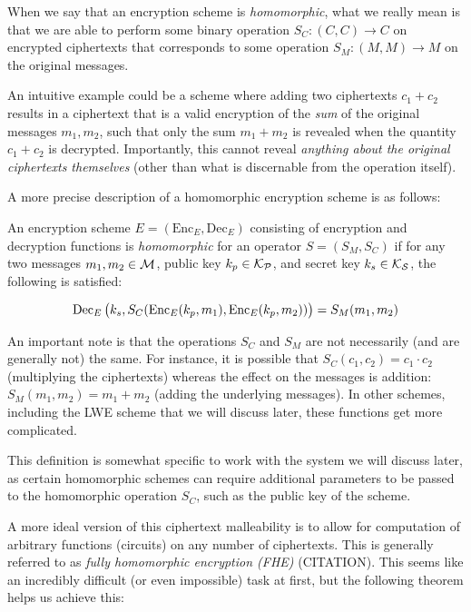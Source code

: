 \documentclass{theme}
\newcommand{\Enc}{\text{Enc}}
\newcommand{\Dec}{\text{Dec}}
\begin{document}
When we say that an encryption scheme is \textit{homomorphic}, what we really mean is that we are able to perform some binary operation $S_C: (C,C) \to C$ on encrypted ciphertexts that corresponds to some operation $S_M: (M, M) \to M$ on the original messages.

An intuitive example could be a scheme where adding two ciphertexts $c_1 + c_2$ results in a ciphertext that is a valid encryption of the \textit{sum} of the original messages $m_1,m_2$, such that only the sum $m_1 + m_2$ is revealed when the quantity $c_1 + c_2$ is decrypted. Importantly, this cannot reveal \textit{anything about the original ciphertexts themselves} (other than what is discernable from the operation itself).

A more precise description of a homomorphic encryption scheme is as follows:

\begin{ndefinition}
    An encryption scheme $E = (\Enc_E, \Dec_E)$ consisting of encryption and decryption functions is \textit{homomorphic} for an operator $S = (S_M, S_C)$ if for any two messages $m_1, m_2 \in \mathcal{M}$, public key $k_p \in \mathcal{K_P}$, and secret key $k_s \in \mathcal{K_S}$, the following is satisfied:

    \begin{equation}
        \Dec_E\p{k_s, S_C(\Enc_E(k_p, m_1), \Enc_E(k_p, m_2))} = S_M(m_1, m_2)
    \end{equation}
\end{ndefinition}

An important note is that the operations $S_C$ and $S_M$ are not necessarily (and are generally not) the same. For instance, it is possible that $S_C(c_1, c_2) = c_1 \cdot c_2$ (multiplying the ciphertexts) whereas the effect on the messages is addition: $S_M(m_1, m_2) = m_1 + m_2$ (adding the underlying messages). In other schemes, including the LWE scheme that we will discuss later, these functions get more complicated.

This definition is somewhat specific to work with the system we will discuss later, as certain homomorphic schemes can require additional parameters to be passed to the homomorphic operation $S_C$, such as the public key of the scheme.

A more ideal version of this ciphertext malleability is to allow for computation of arbitrary functions (circuits) on any number of ciphertexts. This is generally referred to as \textit{fully homomorphic encryption (FHE)} (CITATION). This seems like an incredibly difficult (or even impossible) task at first, but the following theorem helps us achieve this:
\end{document}
